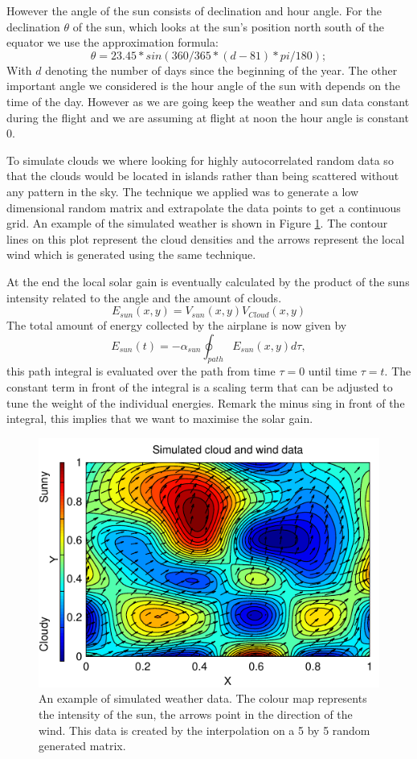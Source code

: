However the angle of the sun consists of declination and hour angle. For the declination $\theta$ of the sun, which looks at the sun's position north south of the equator  we use the approximation formula:
\begin{equation}
\theta = 23.45 * sin(360/365 * (d -81)*pi/180);
\end{equation}
With $d$ denoting the number of days since the beginning of the year. The other important angle we considered is the hour angle of the sun with depends on the time of the day. However as we are going keep the weather and sun data constant during the flight and we are assuming at flight at noon the hour angle is constant 0.


To simulate clouds we where looking for highly autocorrelated random data so that the clouds would be located in islands rather than being scattered without any pattern in the sky.
The technique we applied was to generate a low dimensional random matrix and extrapolate the data points to get a continuous grid.
An example of the simulated weather is shown in Figure \ref{fig:RandomWeather}.
The contour lines on this plot represent the cloud densities and the arrows represent the local wind which is generated using the same technique.

At the end the local solar gain is eventually calculated by the product of the suns intensity related to the angle and the amount of clouds.
\begin{equation}
E_{sun}(x,y)  =  V_{sun}(x,y) V_{Cloud}(x,y)
\end{equation}
The total amount of energy collected by the airplane is now given by 
\begin{equation}
E_{sun}(t)  =  -\alpha_{sun}\oint_{path} E_{sun}(x,y)  d\tau,
\end{equation}
this path integral is evaluated over the path from time $ \tau=0 $ until time $ \tau=t $.
The constant term in front of the integral is a scaling term that can be adjusted to tune the weight of the individual energies.
Remark the minus sing in front of the integral, this implies that we want to maximise the solar gain.

\begin{figure}
\centering
\includegraphics[width=0.5\linewidth]{../src/plot/RandomWeather}
\caption{An example of  simulated weather data. The colour map represents the intensity of the sun, the arrows point in the direction of the wind. This data is created by the  interpolation on a 5 by 5 random generated matrix. }
\label{fig:RandomWeather}
\end{figure}


